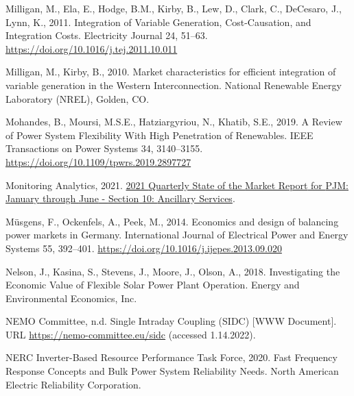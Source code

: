 \documentclass[12pt,a4paper,]{report}
\newlength{\cslhangindent}
\newenvironment{CSLReferences}[2] %
 {%
  \setlength{\parindent}{0pt}
  \ifodd #1 \everypar{\setlength{\hangindent}{\cslhangindent}}\ignorespaces\fi
  \ifnum #2 > 0
  \setlength{\parskip}{#2\baselineskip}
  \fi
 }%
 {}
\begin{document}
\begin{CSLReferences}{1}{0}
\leavevmode{}%
Milligan, M., Ela, E., Hodge, B.M., Kirby, B., Lew, D., Clark, C.,
DeCesaro, J., Lynn, K., 2011. Integration of {Variable Generation},
{Cost-Causation}, and {Integration Costs}. Electricity Journal 24,
51--63. \url{https://doi.org/10.1016/j.tej.2011.10.011}

\leavevmode{}%
Milligan, M., Kirby, B., 2010. Market characteristics for efficient
integration of variable generation in the {Western Interconnection}.
{National Renewable Energy Laboratory (NREL)}, {Golden, CO}.

\leavevmode{}%
Mohandes, B., Moursi, M.S.E., Hatziargyriou, N., Khatib, S.E., 2019. A
{Review} of {Power System Flexibility With High Penetration} of
{Renewables}. IEEE Transactions on Power Systems 34, 3140--3155.
\url{https://doi.org/10.1109/tpwrs.2019.2897727}

\leavevmode{}%
Monitoring Analytics, 2021.
\href{https://www.monitoringanalytics.com/reports/PJM_State_of_the_Market/2021.shtml}{2021
{Quarterly State} of the {Market Report} for {PJM}: {January} through
{June} - {Section} 10: {Ancillary Services}}.

\leavevmode{}%
Müsgens, F., Ockenfels, A., Peek, M., 2014. Economics and design of
balancing power markets in {Germany}. International Journal of
Electrical Power and Energy Systems 55, 392--401.
\url{https://doi.org/10.1016/j.ijepes.2013.09.020}

\leavevmode{}%
Nelson, J., Kasina, S., Stevens, J., Moore, J., Olson, A., 2018.
Investigating the {Economic Value} of {Flexible Solar Power Plant
Operation}. {Energy and Environmental Economics, Inc.}

\leavevmode{}%
NEMO Committee, n.d. Single Intraday Coupling (SIDC) {[}WWW Document{]}.
URL \url{https://nemo-committee.eu/sidc} (accessed 1.14.2022).

\leavevmode{}%
NERC Inverter-Based Resource Performance Task Force, 2020. Fast
{Frequency Response Concepts} and {Bulk Power System Reliability Needs}.
{North American Electric Reliability Corporation}.


\end{CSLReferences}
\end{document}

